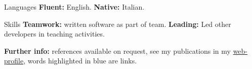 
\begin{cvskills}

\cvskill
{Languages}
{\textbf{Fluent:} English. \textbf{Native:} Italian.}

\cvskill
{Skills}
{\textbf{Teamwork:} written software as part of team. \textbf{Leading:} Led 
other developers in teaching activities.}

\end{cvskills}

\vspace{-2mm}
\flushleft
\footnotesize
\item {\color{awesome-red}\textbf{Fur}}{\color{awesome-darknight}\textbf{ther 
info:}} references available on request, see my publications in my 
{\color{myblue}\href{https://www.ncl.ac.uk/engineering/staff/profile/alessandrode-gennaro.html}{web-profile}},
words highlighted in {\color{myblue}blue} are links.